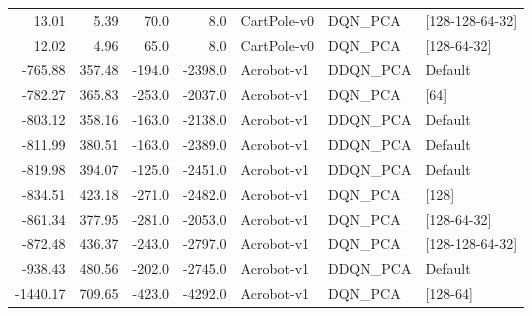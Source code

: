 \begin{tabular}{rrrrlll}
   13.01 &    5.39 &   70.0 &     8.0 &     CartPole-v0 &   DQN\_PCA &  [128-128-64-32] \\
   12.02 &    4.96 &   65.0 &     8.0 &     CartPole-v0 &   DQN\_PCA &       [128-64-32] \\
 -765.88 &  357.48 & -194.0 & -2398.0 &      Acrobot-v1 &  DDQN\_PCA &             Default \\
 -782.27 &  365.83 & -253.0 & -2037.0 &      Acrobot-v1 &   DQN\_PCA &                [64] \\
 -803.12 &  358.16 & -163.0 & -2138.0 &      Acrobot-v1 &  DDQN\_PCA &             Default \\
 -811.99 &  380.51 & -163.0 & -2389.0 &      Acrobot-v1 &  DDQN\_PCA &             Default \\
 -819.98 &  394.07 & -125.0 & -2451.0 &      Acrobot-v1 &  DDQN\_PCA &             Default \\
 -834.51 &  423.18 & -271.0 & -2482.0 &      Acrobot-v1 &   DQN\_PCA &               [128] \\
 -861.34 &  377.95 & -281.0 & -2053.0 &      Acrobot-v1 &   DQN\_PCA &       [128-64-32] \\
 -872.48 &  436.37 & -243.0 & -2797.0 &      Acrobot-v1 &   DQN\_PCA &  [128-128-64-32] \\
 -938.43 &  480.56 & -202.0 & -2745.0 &      Acrobot-v1 &  DDQN\_PCA &             Default \\
-1440.17 &  709.65 & -423.0 & -4292.0 &      Acrobot-v1 &   DQN\_PCA &           [128-64] \\
\bottomrule
\end{tabular}
